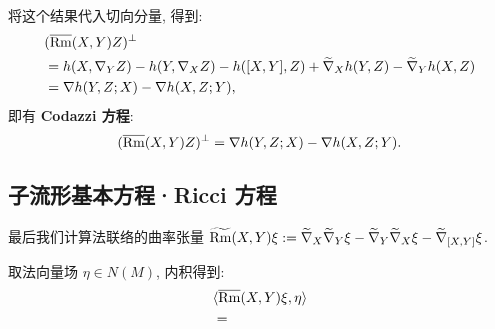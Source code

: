 \documentclass{ctexart}
\begin{document}
将这个结果代入切向分量, 得到:
\begin{align*}
	&(\overline{\mathrm{Rm}}(X, Y)Z)^{\perp} \\
	&= h(X, \nabla_{Y}{Z}) - h(Y, \nabla_{X}{Z}) - h([X, Y], Z) + \widetilde{\nabla}_{X}{h(Y, Z)} - \widetilde{\nabla}_{Y}{h(X, Z)} \\
	&= \nabla h(Y, Z; X) - \nabla h(X, Z; Y),
\end{align*}
即有 {\bf Codazzi 方程}:
\begin{equation}\label{eq::Codazzi-equation}
	(\overline{\mathrm{Rm}}(X, Y)Z)^{\perp} = \nabla h(Y, Z; X) - \nabla h(X, Z; Y).
\end{equation}

\subsection{子流形基本方程·Ricci 方程}
最后我们计算法联络的曲率张量 $\widetilde{\mathrm{Rm}}(X, Y)\xi := \widetilde{\nabla}_{X}{\widetilde{\nabla}_{Y}{\xi}} - \widetilde{\nabla}_{Y}{\widetilde{\nabla}_{X}{\xi}} - \widetilde{\nabla}_{[X, Y]}{\xi}$.

取法向量场 $\eta \in N(M)$, 内积得到:
\begin{align*}
	&\langle {\overline{\mathrm{Rm}}(X, Y)\xi}, {\eta} \rangle \\
	&=  
\end{align*}
\end{document}
